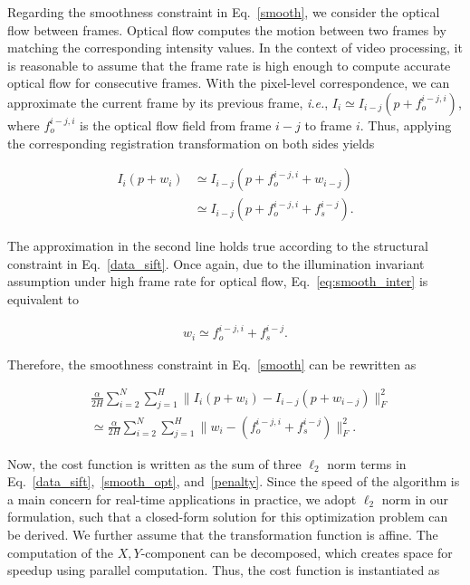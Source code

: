 \documentclass[10pt,journal]{IEEEtran}
\begin{document}
Regarding the smoothness constraint in Eq.~\eqref{smooth}, we consider the optical flow between frames. Optical flow computes the motion between two frames by matching the corresponding intensity values. In the context of video processing, it is reasonable to assume that the frame rate is high enough to compute accurate optical flow for consecutive frames. With the pixel-level correspondence, we can approximate the current frame by its previous frame, \textit{i.e.}, $I_i\simeq I_{i-j}(p+f_o^{i-j,i})$, where $f_o^{i-j,i}$ is the optical flow field from frame $i-j$ to frame $i$. Thus, applying the corresponding registration transformation on both sides yields

\begin{equation}
\begin{aligned}
\label{eq:smooth_inter}
I_i(p+w_i)& \simeq I_{i-j}(p+f_o^{i-j,i}+w_{i-j}) \\
					& \simeq I_{i-j}(p+f_o^{i-j,i}+f_s^{i-j}).
\end{aligned}
\end{equation}

The approximation in the second line holds true according to the structural constraint in Eq.~\eqref{data_sift}. Once again, due to the illumination invariant assumption under high frame rate for optical flow, Eq.~\eqref{eq:smooth_inter} is equivalent to

\begin{equation}
\begin{aligned}
w_i \simeq f_o^{i-j,i}+f_s^{i-j}.
\end{aligned}
\end{equation}

Therefore, the smoothness constraint in Eq.~\eqref{smooth} can be rewritten as

\begin{equation}
\begin{aligned}
\label{smooth_opt}
&\frac{\alpha}{2H}\sum_{i=2}^{N}\sum_{j=1}^{H}\parallel{I_i(p+w_i)-I_{i-j}(p+w_{i-j})}\parallel_F^2 \\
&\simeq\frac{\alpha}{2H}\sum_{i=2}^{N}\sum_{j=1}^{H}\parallel{w_i-(f_o^{i-j,i}+f_s^{i-j})}\parallel_F^2.
\end{aligned}
\end{equation}


Now, the cost function is written as the sum of three $\ell_2$ norm terms in Eq.~\eqref{data_sift},~\eqref{smooth_opt}, and~\eqref{penalty}. Since the speed of the algorithm is a main concern for real-time applications in practice, we adopt $\ell_2$ norm in our formulation, such that a closed-form solution for this optimization problem can be derived. We further assume that the transformation function is affine. The computation of the $X,Y$-component can be decomposed, which creates space for speedup using parallel computation. Thus, the cost function is instantiated as
\end{document}
